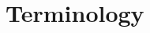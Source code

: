 \documentclass{scrartcl}
\begin{document}
%  
%  
%  


\clearpage
\section{Terminology}
\end{document}
